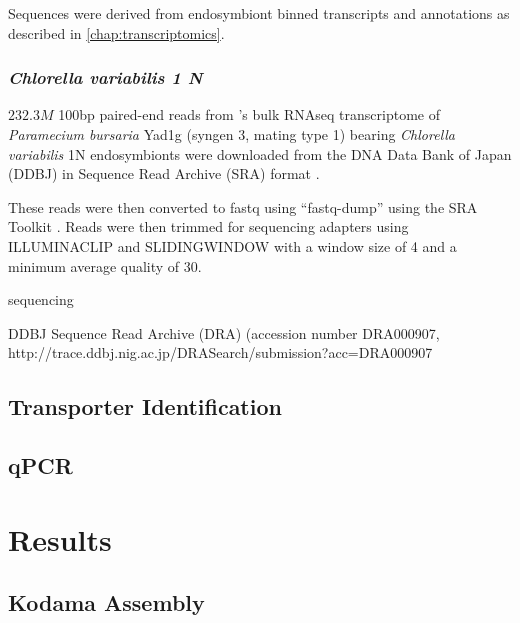 Sequences were derived from endosymbiont binned
transcripts and annotations as described in \ref{chap:transcriptomics}.




\subsubsection{\textit{Chlorella variabilis 1 N}}

\(232.3M\) 100bp paired-end reads from \citep{Kodama2014}'s 
bulk RNAseq transcriptome of \textit{Paramecium bursaria} Yad1g (syngen
3, mating type 1) bearing \textit{Chlorella variabilis} 1N endosymbionts
were downloaded from the DNA Data Bank of Japan (DDBJ) \citep{Tateno2002,Kaminuma2011}
in Sequence Read Archive (SRA) format \citep{Leinonen2011,KodamaNRA2012b}. 

These reads were then converted to fastq using ``fastq-dump'' using the SRA Toolkit
\citep{NationalCenterforBiotechnologyInformation2011}.  Reads were then trimmed
for sequencing adapters using ILLUMINACLIP and SLIDINGWINDOW with a window size
of 4 and a minimum average quality of 30.














sequencing


DDBJ Sequence Read Archive (DRA) (accession number DRA000907, http://trace.ddbj.nig.ac.jp/DRASearch/submission?acc=DRA000907



\subsection{Transporter Identification}

\subsection{qPCR}


\section{Results}


\subsection{Kodama Assembly}


